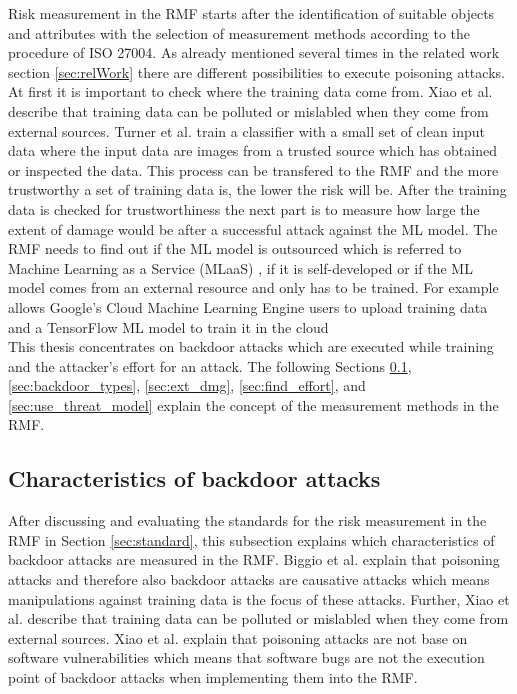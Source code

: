 Risk measurement in the RMF starts after the identification of suitable objects and attributes with the selection of measurement methods according to the procedure of ISO 27004. As already mentioned several times in the related work section \ref{sec:relWork} there are different possibilities to execute poisoning attacks. At first it is important to check where the training data come from. Xiao et al. \cite{DBLP:conf/sp/XiaoLZX18} describe that training data can be polluted or mislabled when they come from external sources. Turner et al. train a classifier with a small set of clean input data where the input data are images from a trusted source which has obtained or inspected the data. This process can be transfered to the RMF and the more trustworthy a set of training data is, the lower the risk will be. After the training data is checked for trustworthiness the next part is to measure how large the extent of damage would be after a successful attack against the ML model. The RMF needs to find out if the ML model is outsourced which is referred to Machine Learning as a Service (MLaaS) \cite{DBLP:journals/corr/abs-1708-06733}, if it is self-developed or if the ML model comes from an external resource and only has to be trained. For example allows Google's Cloud Machine Learning Engine \cite{google_ai2022} users to upload training data and a TensorFlow ML model to train it
in the cloud \cite{DBLP:journals/corr/abs-1708-06733} \\ This thesis concentrates on backdoor attacks which are executed while training and the attacker's effort for an attack. The following
Sections \ref{sec:charac_backdoor}, \ref{sec:backdoor_types}, \ref{sec:ext_dmg}, \ref{sec:find_effort}, and \ref{sec:use_threat_model} explain the concept of the measurement methods in the RMF.

\subsection{Characteristics of backdoor attacks}
\label{sec:charac_backdoor}

After discussing and evaluating the standards for the risk measurement in the RMF in Section \ref{sec:standard}, this subsection explains which characteristics of backdoor attacks are measured in the RMF. Biggio et al. \cite{DBLP:conf/icml/BiggioNL12} explain that poisoning attacks and therefore also backdoor attacks are causative attacks which means manipulations against training data is the focus of these attacks. Further, Xiao et al. \cite{DBLP:conf/sp/XiaoLZX18} describe that training data can be polluted or mislabled when they come from external sources. Xiao et al. explain that poisoning attacks are not base on software vulnerabilities which means that software bugs are not the execution point of backdoor attacks when implementing them into the RMF.

